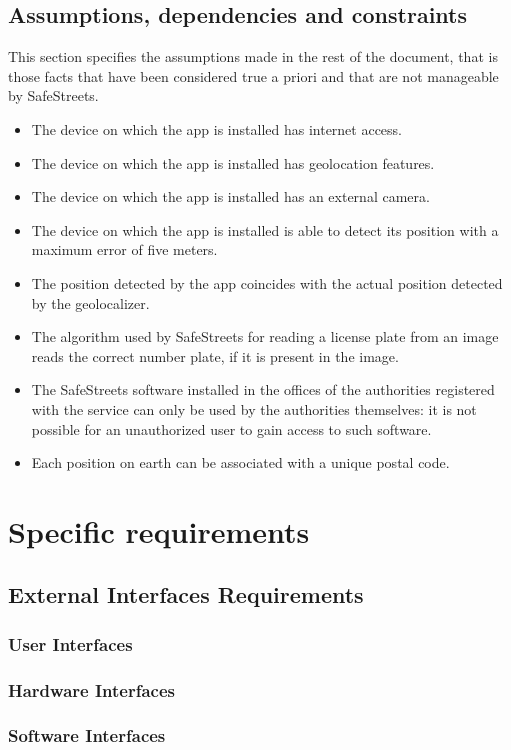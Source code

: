 \documentclass{article}
\begin{document}
	\subsection{Assumptions, dependencies and constraints}
		This section specifies the assumptions made in the rest of the document, that is those facts that have been considered true a priori and that are not manageable by SafeStreets.
		\begin{itemize}
			\item The device on which the app is installed has internet access.
			\item The device on which the app is installed has geolocation features.
			\item The device on which the app is installed has an external camera.
			\item The device on which the app is installed is able to detect its position with a maximum error of five meters.
			\item The position detected by the app coincides with the actual position detected by the geolocalizer.
			\item The algorithm used by SafeStreets for reading a license plate from an image reads the correct number plate, if it is present in the image.
			\item The SafeStreets software installed in the offices of the authorities registered with the service can only be used by the authorities themselves: it is not possible for an unauthorized user to gain access to such software.
			\item Each position on earth can be associated with a unique postal code.
		\end{itemize}
	
	\section{Specific requirements}
	\subsection{External Interfaces Requirements}
	\subsubsection{User Interfaces}
	\subsubsection{Hardware Interfaces}
	\subsubsection{Software Interfaces}
\end{document}
